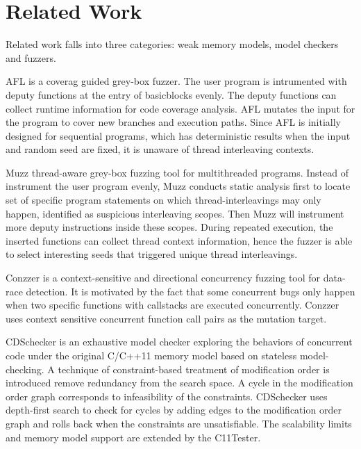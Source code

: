 \chapter{\label{cha:related}Related Work}

Related work falls into three categories: weak memory models, model checkers and fuzzers. 



AFL\cite{afl} is a coverag guided grey-box fuzzer. The user program is intrumented with deputy functions at the entry of basicblocks evenly. The deputy functions can collect runtime information for code coverage analysis. AFL mutates the input for the program to cover new branches and execution paths. Since AFL is initially designed for sequential programs, which has deterministic results when the input and random seed are fixed, it is unaware of thread interleaving contexts. 

Muzz\cite{muzz} thread-aware grey-box fuzzing tool for multithreaded programs. Instead of instrument the user program evenly, Muzz conducts static analysis first to locate set of specific program statements on which thread-interleavings may only happen, identified as suspicious interleaving scopes. Then Muzz will instrument more deputy instructions inside these scopes. During repeated execution, the inserted functions can collect thread context information, hence the fuzzer is able to select interesting seeds that triggered unique thread interleavings. 

Conzzer\cite{conzzer} is a context-sensitive and directional concurrency fuzzing tool for data-race detection. It is motivated by the fact that some concurrent bugs only happen when two specific functions with callstacks are executed concurrently. Conzzer uses context sensitive concurrent function call pairs as the mutation target. 



CDSchecker\cite{cdschecker} is an exhaustive model checker exploring the behaviors of concurrent code under the original C/C++11 memory model based on stateless model-checking. A technique of constraint-based treatment of modification order is introduced remove redundancy from the search space. A cycle in the modification order graph corresponds to infeasibility of the constraints. CDSchecker uses depth-first search to check for cycles by adding edges to the modification order graph and rolls back when the constraints are unsatisfiable. The scalability limits and memory model support are extended by the C11Tester. 

